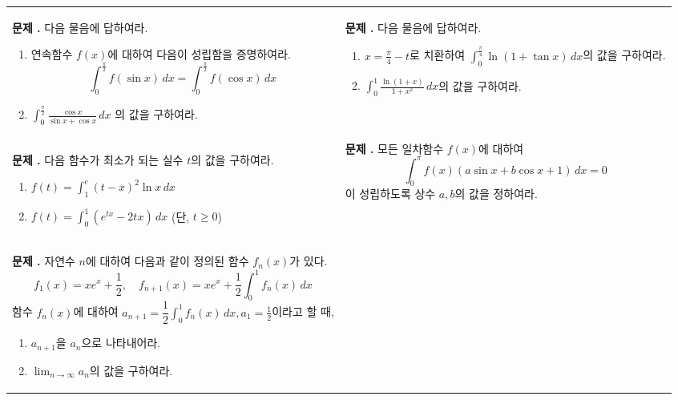 \documentclass[10pt, a4paper]{article}
\newcounter{probcount}
\newcommand{\exercise}[1]{%
    \stepcounter{probcount}%
    \begin{minipage}[t][110mm][t]{0.44\textwidth}
        \small 
        \vspace{1mm}
        \noindent \textbf{문제 \arabic{probcount}.} #1
    \end{minipage}%
    }
\begin{document}
\begin{longtable}{p{} | p{}}
    \exercise{다음 물음에 답하여라.
\begin{enumerate} [label=(\arabic*), leftmargin=8mm, nosep]
    \item 연속함수 $f(x)$에 대하여 다음이 성립함을 증명하여라.
    \[ \int_{0}^{\frac{\pi}{2}} f(\sin x) \, dx = \int_{0}^{\frac{\pi}{2}} f(\cos x) \, dx \]
    \item $\displaystyle \int_{0}^{\frac{\pi}{2}} \frac{\cos x}{\sin x + \cos x} \, dx$ 의 값을 구하여라.
\end{enumerate}} 
    & 
    \exercise{다음 물음에 답하여라.
\begin{enumerate}[label=(\arabic*), leftmargin=8mm, nosep]
    \item $x = \frac{\pi}{4} - t$로 치환하여 $\displaystyle \int_{0}^{\frac{\pi}{4}} \ln(1 + \tan x) \, dx$의 값을 구하여라.
    \item $\displaystyle \int_{0}^{1} \frac{\ln(1+x)}{1+x^2} \, dx$의 값을 구하여라.
\end{enumerate}} \\
    
    \exercise{다음 함수가 최소가 되는 실수 $t$의 값을 구하여라.
\begin{enumerate}[label=(\arabic*), leftmargin=8mm, nosep]
    \item $f(t) = \int_{1}^{e} (t-x)^2 \ln x \, dx$
    \item $f(t) = \int_{0}^{1} (e^{tx} - 2tx) \, dx$ (단, $t \ge 0$)
\end{enumerate}}
    & 
    \exercise{모든 일차함수 $f(x)$에 대하여 
\[ \int_{0}^{\pi} f(x)(a \sin x + b \cos x + 1) \, dx = 0 \]
이 성립하도록 상수 $a, b$의 값을 정하여라.} \\
\hline

    \exercise{자연수 $n$에 대하여 다음과 같이 정의된 함수 $f_n(x)$가 있다.
\[ f_1(x) = xe^x + \frac{1}{2}, \quad f_{n+1}(x) = xe^x + \frac{1}{2} \int_{0}^{1} f_n(x) \, dx \]
함수 $f_n(x)$에 대하여 $a_{n+1} = \dfrac{1}{2} \int_{0}^{1} f_n(x) \, dx, a_1 = \frac{1}{2}$이라고 할 때,
\begin{enumerate}[label=(\arabic*), leftmargin=8mm, nosep]
    \item $a_{n+1}$을 $a_n$으로 나타내어라.
    \item $\displaystyle \lim_{n \to \infty} a_n$의 값을 구하여라.
\end{enumerate}}
    & 
    \\ %

\end{longtable}
\end{document}
